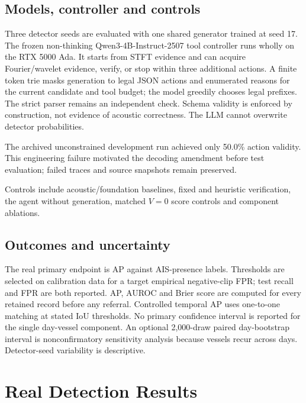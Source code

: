 \documentclass[11pt,letterpaper]{article}
\begin{document}
\subsection{Models, controller and controls}

Three detector seeds are evaluated with one shared generator trained at seed 17. The frozen non-thinking Qwen3-4B-Instruct-2507 \cite{qwen} tool controller runs wholly on the RTX 5000 Ada. It starts from STFT evidence and can acquire Fourier/wavelet evidence, verify, or stop within three additional actions. A finite token trie masks generation to legal JSON actions and enumerated reasons for the current candidate and tool budget; the model greedily chooses legal prefixes. The strict parser remains an independent check. Schema validity is enforced by construction, not evidence of acoustic correctness. The LLM cannot overwrite detector probabilities.\par

{\fontsize{9}{11}\selectfont\noindent The archived unconstrained development run achieved only 50.0\% action validity. This engineering failure motivated the decoding amendment before test evaluation; failed traces and source snapshots remain preserved.\par}

Controls include acoustic/foundation baselines, fixed and heuristic verification, the agent without generation, matched \(V=0\) score controls and component ablations.\par

\subsection{Outcomes and uncertainty}

The real primary endpoint is AP against AIS-presence labels. Thresholds are selected on calibration data for a target empirical negative-clip FPR; test recall and FPR are both reported. AP, AUROC and Brier score are computed for every retained record before any referral. Controlled temporal AP uses one-to-one matching at stated IoU thresholds. No primary confidence interval is reported for the single day-vessel component. An optional 2,000-draw paired day-bootstrap interval is nonconfirmatory sensitivity analysis because vessels recur across days. Detector-seed variability is descriptive.\par

\clearpage

\section{Real Detection Results}
\end{document}
